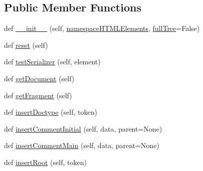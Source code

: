 \subsection*{Public Member Functions}
\begin{DoxyCompactItemize}
\item 
def \hyperlink{classpip_1_1__vendor_1_1html5lib_1_1treebuilders_1_1etree__lxml_1_1TreeBuilder_a79d8db5ad470c796e84a050f80498a4d}{\+\_\+\+\_\+init\+\_\+\+\_\+} (self, \hyperlink{classpip_1_1__vendor_1_1html5lib_1_1treebuilders_1_1etree__lxml_1_1TreeBuilder_aeea224b3d93acc67bdbc729992c7ad70}{namespace\+H\+T\+M\+L\+Elements}, \hyperlink{namespacepip_1_1__vendor_1_1html5lib_1_1treebuilders_1_1etree__lxml_aba667d4a2a267d7c030329d4182b5810}{full\+Tree}=False)
\item 
def \hyperlink{classpip_1_1__vendor_1_1html5lib_1_1treebuilders_1_1etree__lxml_1_1TreeBuilder_a1e5a0ed58a8e885f801fa9da33f474e2}{reset} (self)
\item 
def \hyperlink{classpip_1_1__vendor_1_1html5lib_1_1treebuilders_1_1etree__lxml_1_1TreeBuilder_a1c783de40366d121ca089093866b764b}{test\+Serializer} (self, element)
\item 
def \hyperlink{classpip_1_1__vendor_1_1html5lib_1_1treebuilders_1_1etree__lxml_1_1TreeBuilder_ab45334d1ae83481bdd389196529426e7}{get\+Document} (self)
\item 
def \hyperlink{classpip_1_1__vendor_1_1html5lib_1_1treebuilders_1_1etree__lxml_1_1TreeBuilder_a57bdf7f1586a3ffdf5e2dbff1d2e6609}{get\+Fragment} (self)
\item 
def \hyperlink{classpip_1_1__vendor_1_1html5lib_1_1treebuilders_1_1etree__lxml_1_1TreeBuilder_af7b42fa26f5c86b7d99edd7ddf3f0073}{insert\+Doctype} (self, token)
\item 
def \hyperlink{classpip_1_1__vendor_1_1html5lib_1_1treebuilders_1_1etree__lxml_1_1TreeBuilder_af6a17d25eb06e78ada3a03524aa7530c}{insert\+Comment\+Initial} (self, data, parent=None)
\item 
def \hyperlink{classpip_1_1__vendor_1_1html5lib_1_1treebuilders_1_1etree__lxml_1_1TreeBuilder_a0648d9235b353ced1af77c22a58f9d2a}{insert\+Comment\+Main} (self, data, parent=None)
\item 
def \hyperlink{classpip_1_1__vendor_1_1html5lib_1_1treebuilders_1_1etree__lxml_1_1TreeBuilder_a464b9339aa7969c678202e0e445fee38}{insert\+Root} (self, token)
\end{DoxyCompactItemize}

